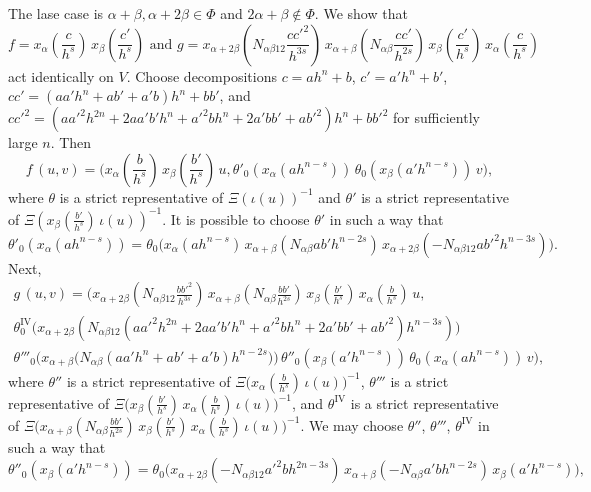 \documentclass[oneside, 11pt]{amsart} \pdfoutput=1
\begin{document}

The lase case is $\alpha + \beta, \alpha + 2\beta \in \Phi$ and $2\alpha + \beta \notin \Phi$. We show that
$$\textstyle
f = x_\alpha(\frac c {h^s})\, x_\beta(\frac{c'}{h^s})
\text{ and }
g = x_{\alpha + 2\beta}(N_{\alpha \beta 1 2} \frac{c {c'}^2}{h^{3s}})\, x_{\alpha + \beta}(N_{\alpha \beta} \frac{cc'}{h^{2s}})\, x_\beta(\frac{c'}{h^s})\, x_\alpha(\frac c {h^s})
$$ 
act identically on $V$. Choose decompositions $c = ah^n + b$, $c' = a'h^n + b'$, $cc' = (aa' h^n + ab' + a'b) h^n + bb'$, and $c{c'}^2 = (a{a'}^2 h^{2n} + 2aa'b' h^n + {a'}^2 b h^n + 2a'bb' + a{b'}^2) h^n + b{b'}^2$ for sufficiently large $n$.
Then
$$\textstyle
f\,(u, v) = \bigl(x_\alpha(\frac b {h^s})\, x_\beta(\frac{b'}{h^s})\, u,
\theta'_0(x_\alpha(ah^{n - s}))\, \theta_0(x_\beta(a'h^{n - s}))\, v\bigr),
$$
where $\theta$ is a strict representative of $\Xi(\iota(u))^{-1}$ and $\theta'$ is a strict representative of $\Xi(x_\beta(\frac{b'}{h^s})\, \iota(u))^{-1}$. It is possible to choose $\theta'$ in such a way that
$$
\theta'_0(x_\alpha(ah^{n - s})) = \theta_0\bigl(x_\alpha(ah^{n - s})\, x_{\alpha + \beta}(N_{\alpha\beta} ab'h^{n - 2s})\, x_{\alpha + 2\beta}(-N_{\alpha\beta 12} a{b'}^2 h^{n - 3s})\bigr).
$$
Next, 
\begin{multline*}\textstyle
g\, (u, v) = \bigl(x_{\alpha + 2\beta}(N_{\alpha \beta 12} \frac{b{b'}^2}{h^{3s}})\, x_{\alpha+\beta}(N_{\alpha \beta} \frac{bb'}{h^{2s}})\, x_\beta(\frac{b'}{h^s})\, x_\alpha(\frac b {h^s})\, u,\\
\theta^{\mathrm{IV}}_0\bigl(x_{\alpha + 2\beta}(N_{\alpha \beta 12} (a{a'}^2 h^{2n} + 2aa'b' h^n + {a'}^2 b h^n + 2a'bb' + a{b'}^2) h^{n - 3s})\bigr)\\
\theta'''_0\bigl(x_{\alpha + \beta}\bigl(N_{\alpha \beta} (aa' h^n + ab' + a'b) h^{n - 2s}\bigr)\bigr)\, \theta''_0(x_\beta(a'h^{n-s}))\, \theta_0(x_\alpha(ah^{n - s}))\, v\bigr),
\end{multline*}
where $\theta''$ is a strict representative of $\Xi\bigl(x_\alpha(\frac b {h^s})\, \iota(u)\bigr)^{-1}$, $\theta'''$ is a strict representative of $\Xi\bigl(x_\beta(\frac{b'}{h^s})\, x_\alpha(\frac b{h^s})\, \iota(u)\bigr)^{-1}$, and $\theta^{\mathrm{IV}}$ is a strict representative of $\Xi\bigl(x_{\alpha + \beta}(N_{\alpha \beta}\frac{bb'}{h^{2s}})\, x_\beta(\frac{b'}{h^s})\, x_\alpha(\frac b{h^s})\, \iota(u)\bigr)^{-1}$. We may choose $\theta''$, $\theta'''$, $\theta^{\mathrm{IV}}$ in such a way that
$$
\theta''_0(x_\beta(a' h^{n - s})) = \theta_0\bigl(x_{\alpha + 2\beta}(-N_{\alpha \beta 1 2} {a'}^2 bh^{2n - 3s})\, x_{\alpha + \beta}(-N_{\alpha \beta} a'bh^{n - 2s})\, x_\beta(a'h^{n - s})\bigr),
$$
\end{document}
